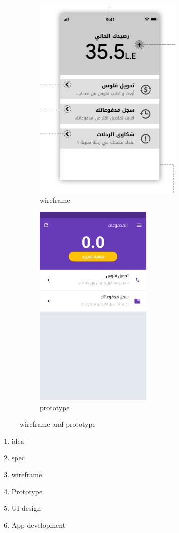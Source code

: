 \begin{figure}
\begin{subfigure}{0.5\textwidth}
\includegraphics[width=1\linewidth, height=10cm]{images/ch3/wireframe.png} 
\caption{wireframe}
\label{fig:subim1}
\end{subfigure}
\begin{subfigure}{0.5\textwidth}
\includegraphics[width=.7\linewidth, height=10cm]{images/ch3/ui.png}
\caption{prototype}
\label{fig:subim2}
\end{subfigure}
\caption{wireframe and prototype}
\label{fig:image2}

    
   
\end{figure}


\begin{enumerate}
 \item idea
\item spec
\item  wireframe
\item Prototype
\item UI design
\item App development 
\end{enumerate}


